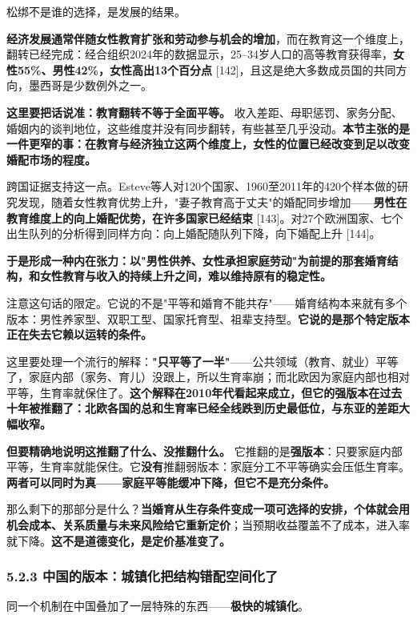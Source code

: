 \documentclass[11pt,a4paper]{ctexart}
\begin{document}
松绑不是谁的选择，是发展的结果。

\textbf{经济发展通常伴随女性教育扩张和劳动参与机会的增加}，而在教育这一个维度上，翻转已经完成：经合组织2024年的数据显示，25–34岁人口的高等教育获得率，\textbf{女性55\%、男性42\%，女性高出13个百分点}{} [142]，且这是绝大多数成员国的共同方向，墨西哥是少数例外之一。

\textbf{这里要把话说准：教育翻转不等于全面平等。} 收入差距、母职惩罚、家务分配、婚姻内的谈判地位，这些维度并没有同步翻转，有些甚至几乎没动。\textbf{本节主张的是一件更窄的事：在教育与经济独立这两个维度上，女性的位置已经改变到足以改变婚配市场的程度。}

跨国证据支持这一点。Esteve等人对120个国家、1960至2011年的420个样本做的研究发现，随着女性教育优势上升，"妻子教育高于丈夫"的婚配同步增加——\textbf{男性在教育维度上的向上婚配优势，在许多国家已经结束}{} [143]。对27个欧洲国家、七个出生队列的分析得到同样方向：向上婚配随队列下降，向下婚配上升 [144]。

\textbf{于是形成一种内在张力：以"男性供养、女性承担家庭劳动"为前提的那套婚育结构，和女性教育与收入的持续上升之间，难以维持原有的稳定性。}

注意这句话的限定。它说的不是"平等和婚育不能共存"——婚育结构本来就有多个版本：男性养家型、双职工型、国家托育型、祖辈支持型。\textbf{它说的是那个特定版本正在失去它赖以运转的条件。}

这里要处理一个流行的解释：\textbf{"只平等了一半"}——公共领域（教育、就业）平等了，家庭内部（家务、育儿）没跟上，所以生育率崩；而北欧因为家庭内部也相对平等，生育率就保住了。\textbf{这个解释在2010年代看起来成立，但它的强版本在过去十年被推翻了：北欧各国的总和生育率已经全线跌到历史最低位，与东亚的差距大幅收窄。}

\textbf{但要精确地说明这推翻了什么、没推翻什么。} 它推翻的是\textbf{强版本}：只要家庭内部平等，生育率就能保住。它\textbf{没有}推翻弱版本：家庭分工不平等确实会压低生育率。\textbf{两者可以同时为真——家庭平等能缓冲下降，但它不是充分条件。}

那么剩下的那部分是什么？\textbf{当婚育从生存条件变成一项可选择的安排，个体就会用机会成本、关系质量与未来风险给它重新定价}；当预期收益覆盖不了成本，进入率就下降。\textbf{这不是道德变化，是定价基准变了。}

\subsubsection{5.2.3 中国的版本：城镇化把结构错配空间化了}

同一个机制在中国叠加了一层特殊的东西——\textbf{极快的城镇化}。
\end{document}
